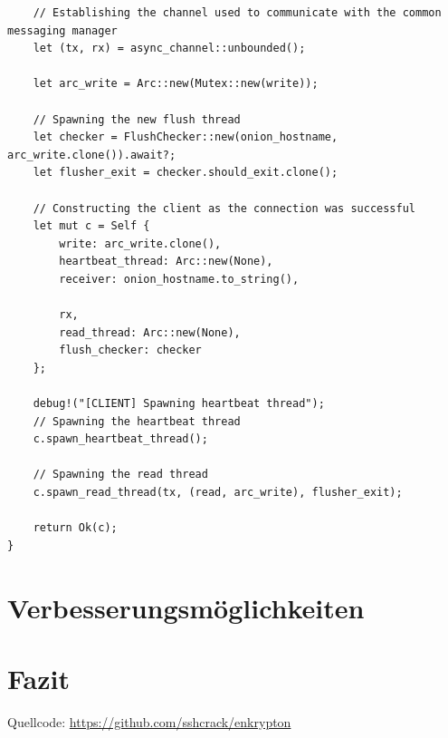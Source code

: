 \documentclass[a4paper,ngerman, headheight=28pt,12pt]{scrartcl}
\begin{document}
\begin{verbatim}
    // Establishing the channel used to communicate with the common messaging manager
    let (tx, rx) = async_channel::unbounded();

    let arc_write = Arc::new(Mutex::new(write));

    // Spawning the new flush thread
    let checker = FlushChecker::new(onion_hostname, arc_write.clone()).await?;
    let flusher_exit = checker.should_exit.clone();

    // Constructing the client as the connection was successful
    let mut c = Self {
        write: arc_write.clone(),
        heartbeat_thread: Arc::new(None),
        receiver: onion_hostname.to_string(),

        rx,
        read_thread: Arc::new(None),
        flush_checker: checker
    };

    debug!("[CLIENT] Spawning heartbeat thread");
    // Spawning the heartbeat thread
    c.spawn_heartbeat_thread();

    // Spawning the read thread
    c.spawn_read_thread(tx, (read, arc_write), flusher_exit);

    return Ok(c);
}
\end{verbatim}

\section{Verbesserungsmöglichkeiten}

\section{Fazit}

\pagebreak
\nolinenumbers{}
\printbibliography[notkeyword={figure}]
\label{LastPageDoc}

\pagebreak
{}%
\appendix
\printbibliography[heading=subbibliography,title={Anhang},keyword={figure}]
Quellcode: \href{https://github.com/sshcrack/enkrypton}{https://github.com/sshcrack/enkrypton}
\end{document}
